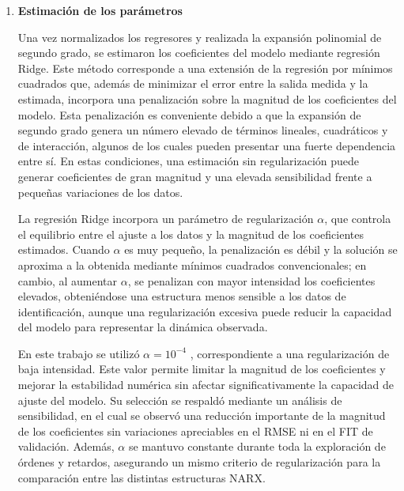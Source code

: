 \documentclass[11pt]{report}
\begin{document}
\begin{enumerate}
Posteriormente, los regresores normalizados fueron sometidos a una expansión polinomial de segundo grado. De esta manera, el modelo incorpora no solo los términos individuales de cada regresor, sino también sus cuadrados y productos cruzados. Así, por ejemplo, puede representar efectos asociados a $u_1^2$, $u_2^2$,$y(k-1)u_1(k-n_{k1})$ o $u_1(k-n_{k1})u_2(k-n_{k2})$. Esta expansión es la que introduce la capacidad no lineal del modelo. En esta identificación el grado polinomial se fijó previamente en 2, para mantener una complejidad computacional acotada.


\item \textbf{Estimación de los parámetros}

Una vez normalizados los regresores y realizada la expansión polinomial de segundo grado, se estimaron los coeficientes del modelo mediante regresión Ridge. Este método corresponde a una extensión de la regresión por mínimos cuadrados que, además de minimizar el error entre la salida medida y la estimada, incorpora una penalización sobre la magnitud de los coeficientes del modelo. Esta penalización es conveniente debido a que la expansión de segundo grado genera un número elevado de términos lineales, cuadráticos y de interacción, algunos de los cuales pueden presentar una fuerte dependencia entre sí. En estas condiciones, una estimación sin regularización puede generar coeficientes de gran magnitud y una elevada sensibilidad frente a pequeñas variaciones de los datos.

La regresión Ridge incorpora un parámetro de regularización $\alpha$, que controla el equilibrio entre el ajuste a los datos y la magnitud de los coeficientes estimados. Cuando $\alpha$ es muy pequeño, la penalización es débil y la solución se aproxima a la obtenida mediante mínimos cuadrados convencionales; en cambio, al aumentar $\alpha$, se penalizan con mayor intensidad los coeficientes elevados, obteniéndose una estructura menos sensible a los datos de identificación, aunque una regularización excesiva puede reducir la capacidad del modelo para representar la dinámica observada.

En este trabajo se utilizó $\alpha=10^{-4}$
, correspondiente a una regularización de baja intensidad. Este valor permite limitar la magnitud de los coeficientes y mejorar la estabilidad numérica sin afectar significativamente la capacidad de ajuste del modelo. Su selección se respaldó mediante un análisis de sensibilidad, en el cual se observó una reducción importante de la magnitud de los coeficientes sin variaciones apreciables en el RMSE ni en el FIT de validación. Además, $\alpha$ se mantuvo constante durante toda la exploración de órdenes y retardos, asegurando un mismo criterio de regularización para la comparación entre las distintas estructuras NARX.



\end{enumerate}
\end{document}
